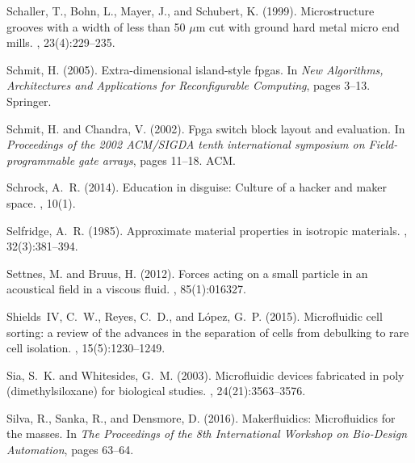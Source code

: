 \documentclass[12pt,letterpaper]{report}          %
\begin{document}
\begin{thebibliography}{}
Schaller, T., Bohn, L., Mayer, J., and Schubert, K. (1999).
\newblock Microstructure grooves with a width of less than 50 $\mu$m cut with
  ground hard metal micro end mills.
, 23(4):229--235.

Schmit, H. (2005).
\newblock Extra-dimensional island-style fpgas.
\newblock In {\em New Algorithms, Architectures and Applications for
  Reconfigurable Computing}, pages 3--13. Springer.

Schmit, H. and Chandra, V. (2002).
\newblock Fpga switch block layout and evaluation.
\newblock In {\em Proceedings of the 2002 ACM/SIGDA tenth international
  symposium on Field-programmable gate arrays}, pages 11--18. ACM.

Schrock, A.~R. (2014).
\newblock Education in disguise: Culture of a hacker and maker space.
, 10(1).

Selfridge, A.~R. (1985).
\newblock Approximate material properties in isotropic materials.
, 32(3):381--394.

Settnes, M. and Bruus, H. (2012).
\newblock Forces acting on a small particle in an acoustical field in a viscous
  fluid.
, 85(1):016327.

Shields~IV, C.~W., Reyes, C.~D., and L{\'o}pez, G.~P. (2015).
\newblock Microfluidic cell sorting: a review of the advances in the separation
  of cells from debulking to rare cell isolation.
, 15(5):1230--1249.

Sia, S.~K. and Whitesides, G.~M. (2003).
\newblock Microfluidic devices fabricated in poly (dimethylsiloxane) for
  biological studies.
, 24(21):3563--3576.

Silva, R., Sanka, R., and Densmore, D. (2016).
\newblock Makerfluidics: Microfluidics for the masses.
\newblock In {\em The Proceedings of the 8th International Workshop on
  Bio-Design Automation}, pages 63--64.


\end{thebibliography}
\end{document}
